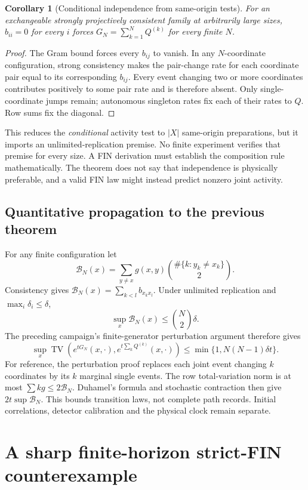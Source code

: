 \documentclass[11pt,a4paper]{article}
\newtheorem{corollary}[theorem]{Corollary}
\newcommand{\TV}{\operatorname{TV}}
\begin{document}
\begin{corollary}[Conditional independence from same-origin tests]
For an exchangeable strongly projectively consistent family at arbitrarily
large sizes, $b_{ii}=0$ for every $i$ forces $G_N=\sum_{k=1}^NQ^{(k)}$
for every finite $N$.
\end{corollary}
\begin{proof}
The Gram bound forces every $b_{ij}$ to vanish. In any $N$-coordinate
configuration, strong consistency makes the pair-change rate for each
coordinate pair equal to its corresponding $b_{ij}$. Every event changing
two or more coordinates contributes positively to some pair rate and is
therefore absent. Only single-coordinate jumps remain; autonomous
singleton rates fix each of their rates to $Q$. Row sums fix the diagonal.
\end{proof}

This reduces the \emph{conditional} activity test to $|X|$ same-origin
preparations, but it imports an unlimited-replication premise. No finite
experiment verifies that premise for every size. A FIN derivation must
establish the composition rule mathematically. The theorem does not say
that independence is physically preferable, and a valid FIN law might
instead predict nonzero joint activity.

\subsection{Quantitative propagation to the previous theorem}

For any finite configuration let
\[
 \mathcal B_N(x)=\sum_{y\ne x}g(x,y)
                \binom{\#\{k:y_k\ne x_k\}}2.
\]
Consistency gives
$\mathcal B_N(x)=\sum_{k<l}b_{x_kx_l}$. Under unlimited replication and
$\max_i\delta_i\le\delta$,
\[
 \sup_x\mathcal B_N(x)\le\binom N2\delta.
\]
The preceding campaign's finite-generator perturbation argument therefore
gives
\[
 \sup_x\TV\left(e^{tG_N}(x,\cdot),
                     e^{t\sum_kQ^{(k)}}(x,\cdot)\right)
 \le\min\{1,N(N-1)\delta t\}.
\]
For reference, the perturbation proof replaces each joint event changing
$k$ coordinates by its $k$ marginal single events. The row total-variation
norm is at most $\sum k g\le2\mathcal B_N$. Duhamel's formula and
stochastic contraction then give $2t\sup\mathcal B_N$.
This bounds transition laws, not complete path records. Initial
correlations, detector calibration and the physical clock remain separate.

\section{A sharp finite-horizon strict-FIN counterexample}
\end{document}
